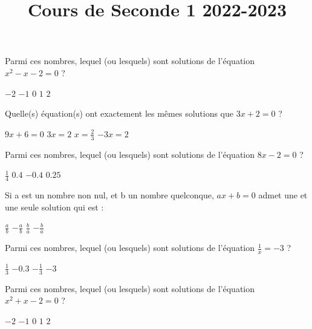 \documentclass[10pt,a4paper]{exam}
\title{Cours de Seconde 1 2022-2023}
\date{}
\begin{document}
Parmi ces nombres, lequel (ou lesquels) sont solutions de l'équation   $x^2 - x - 2 = 0$ ?


\begin{oneparcheckboxes}
   \choice $-2$
   \choice $-1$
   \choice $0$
   \choice $1$
   \choice $2$
\end{oneparcheckboxes}

\vspace{10 mm}
 
Quelle(s) équation(s) ont exactement les mêmes solutions que $3x+2=0$ ?

\begin{oneparcheckboxes}
   \choice $9x+6=0$
   \choice $3x = 2$
   \choice $x= \frac{2}{3}$
   \choice $-3x = 2$
\end{oneparcheckboxes}
 
\vspace{10 mm}

Parmi ces nombres, lequel (ou lesquels) sont solutions de l'équation   $8x-2=0$ ?


\begin{oneparcheckboxes}
   \choice $\frac{1}{4}$
   \choice $0.4$
   \choice $-0.4$
   \choice $0.25$
\end{oneparcheckboxes}
 
\vspace{10 mm}

Si a est un nombre non nul, et b un nombre quelconque, $ax+b=0$  admet une et une seule solution qui est :

\begin{oneparcheckboxes}
   \choice $\frac{a}{b}$
   \choice $-\frac{a}{b}$
   \choice $\frac{b}{a}$
   \choice $-\frac{b}{a}$
\end{oneparcheckboxes}
 
\vspace{10 mm}
Parmi ces nombres, lequel (ou lesquels) sont solutions de l'équation   $\frac{1}{x}=-3$ ?

\begin{oneparcheckboxes}
   \choice $\frac{1}{3}$
   \choice $-0.3$
   \choice $-\frac{1}{3}$
   \choice $-3$
\end{oneparcheckboxes}
 
\vspace{85 mm}

Parmi ces nombres, lequel (ou lesquels) sont solutions de l'équation   $x^2 + x - 2 = 0$ ?


\begin{oneparcheckboxes}
   \choice $-2$
   \choice $-1$
   \choice $0$
   \choice $1$
   \choice $2$
\end{oneparcheckboxes}
\end{document}
